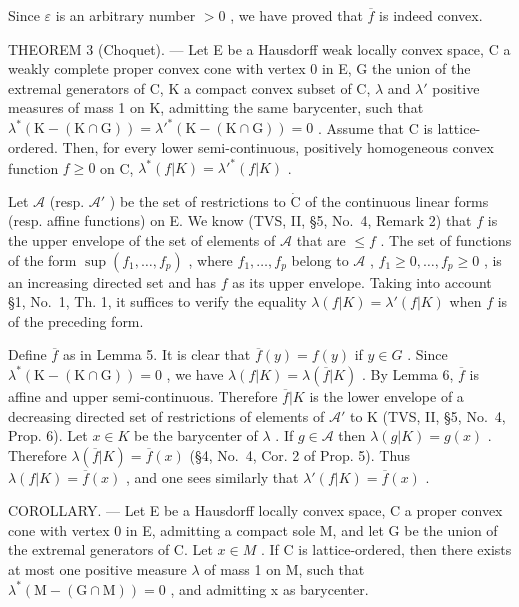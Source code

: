 Since \(\varepsilon\) is an arbitrary number \(>0\) , we have proved that \(\overline{f}\) is indeed convex.

THEOREM 3 (Choquet). --- Let E be a Hausdorff weak locally convex space, C a weakly complete proper convex cone with vertex 0 in E, G the union of the extremal generators of C, K a compact convex subset of C, \(\lambda\) and \(\lambda'\) positive measures of mass 1 on K, admitting the same barycenter, such that \(\lambda^{*}(\mathrm{K} - (\mathrm{K} \cap \mathrm{G})) = \lambda'^{*}(\mathrm{K} - (\mathrm{K} \cap \mathrm{G})) = 0\) . Assume that C is lattice-ordered. Then, for every lower semi-continuous, positively homogeneous convex function \(f \geqslant 0\) on C, \(\lambda^{*}(f|K) = \lambda'^{*}(f|K)\) .

Let \(\mathcal{A}\) (resp. \(\mathcal{A}'\) ) be the set of restrictions to \(\dot{\mathrm{C}}\) of the continuous linear forms (resp. affine functions) on E. We know (TVS, II, §5, No.~4, Remark 2) that \(f\) is the upper envelope of the set of elements of \(\mathcal{A}\) that are \(\leqslant f\) . The set of functions of the form \(\sup(f_1, \ldots, f_p)\) , where \(f_1, \ldots, f_p\) belong to \(\mathscr{A}\) , \(f_1 \geqslant 0, \ldots, f_p \geqslant 0\) , is an increasing directed set and has \(f\) as its upper envelope. Taking into account §1, No.~1, Th. 1, it suffices to verify the equality \(\lambda(f|K) = \lambda'(f|K)\) when \(f\) is of the preceding form.

Define \(\overline{f}\) as in Lemma 5. It is clear that \(\overline{f}(y) = f(y)\) if \(y \in G\) . Since \(\lambda^{*}(\mathrm{K} - (\mathrm{K} \cap \mathrm{G})) = 0\) , we have \(\lambda(f|K) = \lambda(\overline{f}|K)\) . By Lemma 6, \(\overline{f}\) is affine and upper semi-continuous. Therefore \(\overline{f}|K\) is the lower envelope of a decreasing directed set of restrictions of elements of \(\mathcal{A}'\) to K (TVS, II, §5, No.~4, Prop. 6). Let \(x \in K\) be the barycenter of \(\lambda\) . If \(g \in \mathcal{A}\) then \(\lambda(g|K) = g(x)\) . Therefore \(\lambda(\overline{f}|K) = \overline{f}(x)\) (§4, No.~4, Cor. 2 of Prop. 5). Thus \(\lambda(f|K) = \overline{f}(x)\) , and one sees similarly that \(\lambda'(f|K) = \overline{f}(x)\) .

COROLLARY. --- Let E be a Hausdorff locally convex space, C a proper convex cone with vertex 0 in E, admitting a compact sole M, and let G be the union of the extremal generators of C. Let \(x \in M\) . If C is lattice-ordered, then there exists at most one positive measure \(\lambda\) of mass 1 on M, such that \(\lambda^{*}(\mathrm{M} - (\mathrm{G} \cap \mathrm{M})) = 0\) , and admitting x as barycenter.


